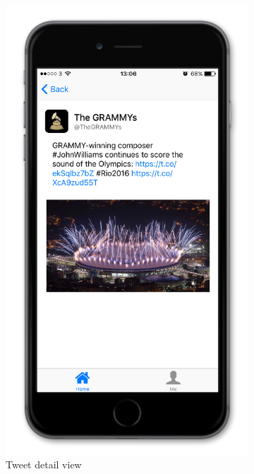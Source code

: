 \documentclass{article}
\begin{document}
\newpage


\begin{figure}[H]
    \vspace{-8em}
    \centering
    \begin{subfigure}[b]{0.48\textwidth}
        \includegraphics[width=\textwidth]{iphone_5_detail}
        \caption{Tweet detail view}
    \end{subfigure}
    ~ 
    \begin{subfigure}[b]{0.48\textwidth}

\end{subfigure}
\end{figure}
\end{document}
